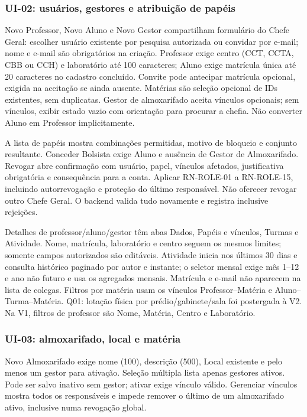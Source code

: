 \subsubsection{UI-02: usuários, gestores e atribuição de papéis}
Novo Professor, Novo Aluno e Novo Gestor compartilham formulário do Chefe Geral: escolher usuário existente por pesquisa autorizada ou convidar por e-mail; nome e e-mail são obrigatórios na criação. Professor exige centro (CCT, CCTA, CBB ou CCH) e laboratório até 100 caracteres; Aluno exige matrícula única até 20 caracteres no cadastro concluído. Convite pode antecipar matrícula opcional, exigida na aceitação se ainda ausente. Matérias são seleção opcional de IDs existentes, sem duplicatas. Gestor de almoxarifado aceita vínculos opcionais; sem vínculos, exibir estado vazio com orientação para procurar a chefia. Não converter Aluno em Professor implicitamente.

A lista de papéis mostra combinações permitidas, motivo de bloqueio e conjunto resultante. Conceder Bolsista exige Aluno e ausência de Gestor de Almoxarifado. Revogar abre confirmação com usuário, papel, vínculos afetados, justificativa obrigatória e consequência para a conta. Aplicar RN-ROLE-01 a RN-ROLE-15, incluindo autorrevogação e proteção do último responsável. Não oferecer revogar outro Chefe Geral. O backend valida tudo novamente e registra inclusive rejeições.

Detalhes de professor/aluno/gestor têm abas Dados, Papéis e vínculos, Turmas e Atividade. Nome, matrícula, laboratório e centro seguem os mesmos limites; somente campos autorizados são editáveis. Atividade inicia nos últimos 30 dias e consulta histórico paginado por autor e instante; o seletor mensal exige mês 1--12 e ano não futuro e usa os agregados mensais. Matrícula e e-mail não aparecem na lista de colegas. Filtros por matéria usam os vínculos Professor--Matéria e Aluno--Turma--Matéria. Q01: lotação física por prédio/gabinete/sala foi postergada à V2. Na V1, filtros de professor são Nome, Matéria, Centro e Laboratório.

\subsubsection{UI-03: almoxarifado, local e matéria}
Novo Almoxarifado exige nome (100), descrição (500), Local existente e pelo menos um gestor para ativação. Seleção múltipla lista apenas gestores ativos. Pode ser salvo inativo sem gestor; ativar exige vínculo válido. Gerenciar vínculos mostra todos os responsáveis e impede remover o último de um almoxarifado ativo, inclusive numa revogação global.

